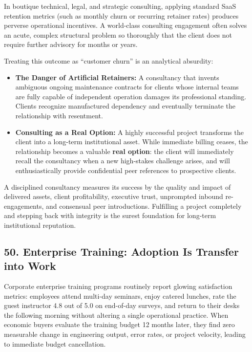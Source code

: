 In boutique technical, legal, and strategic consulting, applying standard SaaS retention metrics (such as monthly churn or recurring retainer rates) produces perverse operational incentives. A world-class consulting engagement often solves an acute, complex structural problem so thoroughly that the client does not require further advisory for months or years.

Treating this outcome as ``customer churn'' is an analytical absurdity:
\begin{itemize}[leftmargin=*]
\item \textbf{The Danger of Artificial Retainers:} A consultancy that invents ambiguous ongoing maintenance contracts for clients whose internal teams are fully capable of independent operation damages its professional standing. Clients recognize manufactured dependency and eventually terminate the relationship with resentment.
\item \textbf{Consulting as a Real Option:} A highly successful project transforms the client into a long-term institutional asset. While immediate billing ceases, the relationship becomes a valuable \textbf{real option}: the client will immediately recall the consultancy when a new high-stakes challenge arises, and will enthusiastically provide confidential peer references to prospective clients.
\end{itemize}

A disciplined consultancy measures its success by the quality and impact of delivered assets, client profitability, executive trust, unprompted inbound re-engagements, and consensual peer introductions. Fulfilling a project completely and stepping back with integrity is the surest foundation for long-term institutional reputation.

\subsection*{50. Enterprise Training: Adoption Is Transfer into Work}

Corporate enterprise training programs routinely report glowing satisfaction metrics: employees attend multi-day seminars, enjoy catered lunches, rate the guest instructor 4.8 out of 5.0 on end-of-day surveys, and return to their desks the following morning without altering a single operational practice. When economic buyers evaluate the training budget 12 months later, they find zero measurable change in engineering output, error rates, or project velocity, leading to immediate budget cancellation.

